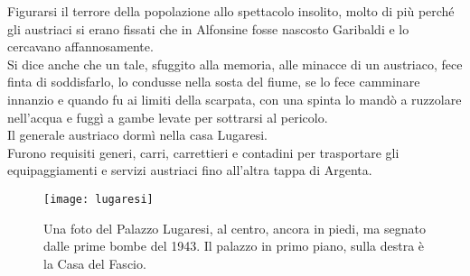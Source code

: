 \indent Figurarsi il terrore della popolazione allo spettacolo insolito, molto di più perché gli austriaci si erano fissati che in Alfonsine fosse nascosto Garibaldi e lo cercavano affannosamente. \\
\indent Si dice anche che un tale, sfuggito alla memoria, alle minacce di un austriaco, fece finta di soddisfarlo, lo condusse nella sosta del fiume, se lo fece camminare innanzio e quando fu ai limiti della scarpata, con una spinta lo mandò a ruzzolare nell'acqua e fuggì a gambe levate per sottrarsi al pericolo.\\
\indent Il generale austriaco dormì nella casa Lugaresi.\\
\indent Furono requisiti generi, carri, carrettieri e contadini per trasportare gli equipaggiamenti e servizi austriaci fino all'altra tappa di Argenta.

 \begin{figure}[htb]
    \centering
    \texttt{[image: lugaresi]}
    \caption*{Una foto del Palazzo Lugaresi, al centro, ancora in piedi, ma segnato dalle prime bombe del 1943. Il palazzo in primo piano, sulla destra è la Casa del Fascio.\label{fig:lugaresi}}
\end{figure}


